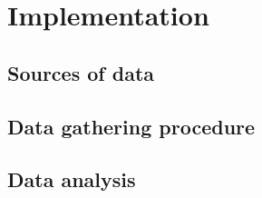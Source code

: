 \chapter{Implementation}
\label{chap:3}






\section{Sources of data}
\bigskip

\section{Data gathering procedure}
\bigskip

\section{Data analysis}
\bigskip


